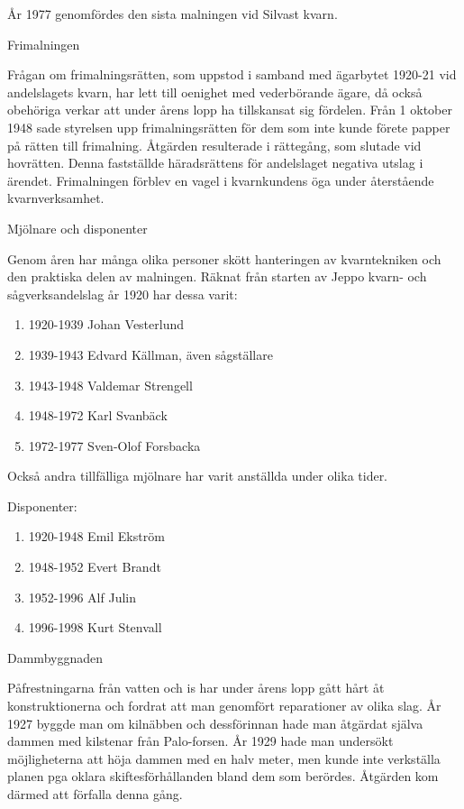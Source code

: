 År 1977 genomfördes den sista malningen vid Silvast kvarn.


Frimalningen

Frågan om frimalningsrätten, som uppstod i samband med ägarbytet 1920-21 vid andelslagets kvarn, har lett till oenighet med vederbörande ägare, då också obehöriga verkar att under årens lopp ha tillskansat sig fördelen. Från 1 oktober 1948 sade styrelsen upp frimalningsrätten för dem som inte kunde förete papper på rätten till frimalning. Åtgärden resulterade i rättegång, som slutade vid hovrätten. Denna fastställde häradsrättens för andelslaget negativa utslag i ärendet. Frimalningen förblev en vagel i kvarnkundens öga under återstående kvarnverksamhet.


Mjölnare och disponenter

Genom åren har många olika personer skött hanteringen av kvarntekniken och den praktiska delen av malningen. Räknat från starten av Jeppo kvarn- och sågverksandelslag år 1920 har dessa varit:

\begin{enumerate}
  \item 1920-1939		Johan Vesterlund
  \item 1939-1943		Edvard Källman, även sågställare
  \item 1943-1948		Valdemar Strengell
  \item 1948-1972		Karl Svanbäck
  \item 1972-1977		Sven-Olof Forsbacka
\end{enumerate}

Också andra tillfälliga mjölnare har varit anställda under olika tider.

Disponenter:

\begin{enumerate}
  \item 1920-1948		Emil Ekström
  \item 1948-1952		Evert Brandt
  \item 1952-1996		Alf Julin
  \item 1996-1998	  Kurt Stenvall
\end{enumerate}


Dammbyggnaden

Påfrestningarna från vatten och is har under årens lopp gått hårt åt konstruktionerna och fordrat att man genomfört reparationer av olika slag. År 1927 byggde man om kilnäbben och dessförinnan hade man åtgärdat själva dammen med kilstenar från Palo-forsen. År 1929 hade man undersökt möjligheterna att höja dammen med en halv meter, men kunde inte verkställa planen pga oklara skiftesförhållanden bland dem som berördes. Åtgärden kom därmed att förfalla denna gång.

